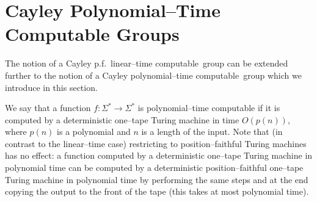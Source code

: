 \documentclass[article,12pt]{elsarticle}
\newcommand\linearC{Cayley p.f.~linear--time computable}
\newcommand\polyC{Cayley polynomial--time computable}
\begin{document}
\section{Cayley Polynomial--Time Computable Groups} 
\label{Cayleypoltimecomp_section} 

The notion of a \linearC\ group 
can be extended further to the notion of a 
\polyC\ group which we introduce in this section.  


We say that a function 
$f : \Sigma^* \rightarrow \Sigma^*$ is 
polynomial--time computable if 
it is computed by a deterministic
one--tape Turing machine in time $O(p(n))$, 
where $p(n)$ is a polynomial and $n$ is a 
length of the input.  
Note that  (in contrast to the linear--time case) 
restricting to position--faithful Turing machines
has no effect: a function computed by a deterministic 
one--tape Turing machine in polynomial time can be  computed by a deterministic position--faithful one--tape Turing machine in polynomial time by performing the same steps and at the end copying the output to the front of the tape 
(this takes at most polynomial time). 
\end{document}
